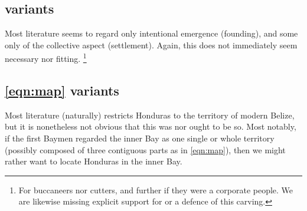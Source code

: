 	\subsection{ variants}
	\label{ss:possyemergences}
		Most literature seems to regard only intentional emergence (founding), and some only of the collective aspect (settlement). Again, this does not immediately seem necessary nor fitting.%
		\footnote{For buccaneers nor cutters, and further if they were a corporate people. We are likewise missing explicit support for or a defence of this carving.}
	\subsection{\ref{eqn:map} variants}
	\label{ss:possymaps}
		Most literature (naturally) restricts Honduras to the territory of modern Belize, but it is nonetheless not obvious that this was nor ought to be so. Most notably, if the first Baymen regarded the inner Bay as one single or whole territory (possibly composed of three contiguous parts as in \ref{eqn:map}), then we might rather want to locate Honduras in the inner Bay.%

